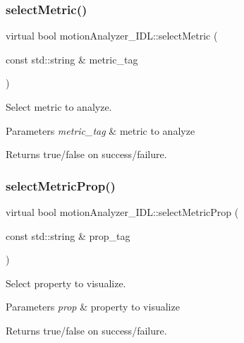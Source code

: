 \subsubsection{\texorpdfstring{select\+Metric()}{selectMetric()}}
{\footnotesize\ttfamily virtual bool motion\+Analyzer\+\_\+\+I\+D\+L\+::select\+Metric (\begin{DoxyParamCaption}\item[{const std\+::string \&}]{metric\+\_\+tag }\end{DoxyParamCaption})\hspace{0.3cm}{\ttfamily [virtual]}}



Select metric to analyze. 


\begin{DoxyParams}{Parameters}
{\em metric\+\_\+tag} & metric to analyze \\
\hline
\end{DoxyParams}
\begin{DoxyReturn}{Returns}
true/false on success/failure. 
\end{DoxyReturn}
\mbox{\label{classmotionAnalyzer__IDL_a964bfaa136ee53f793260747531a9cb2}} 
\subsubsection{\texorpdfstring{select\+Metric\+Prop()}{selectMetricProp()}}
{\footnotesize\ttfamily virtual bool motion\+Analyzer\+\_\+\+I\+D\+L\+::select\+Metric\+Prop (\begin{DoxyParamCaption}\item[{const std\+::string \&}]{prop\+\_\+tag }\end{DoxyParamCaption})\hspace{0.3cm}{\ttfamily [virtual]}}



Select property to visualize. 


\begin{DoxyParams}{Parameters}
{\em prop} & property to visualize \\
\hline
\end{DoxyParams}
\begin{DoxyReturn}{Returns}
true/false on success/failure. 
\end{DoxyReturn}
\mbox{\label{classmotionAnalyzer__IDL_a158f8a856611aa5d4bcab9adc9c67a5d}} 
